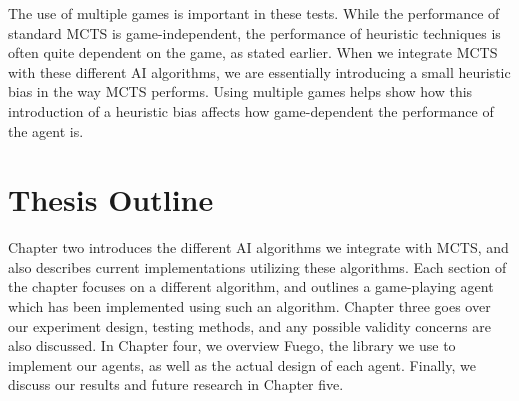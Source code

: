The use of multiple games is important in these tests.  While the performance of standard MCTS is game-independent, the performance of heuristic techniques is often quite dependent on the game, as stated earlier.  When we integrate MCTS with these different AI algorithms, we are essentially introducing a small heuristic bias in the way MCTS performs.  Using multiple games helps show how this introduction of a heuristic bias affects how game-dependent the performance of the agent is.


\section{Thesis Outline}\label{sec:outline}
Chapter two introduces the different AI algorithms we integrate with MCTS, and also describes current implementations utilizing these algorithms.  Each section of the chapter focuses on a different algorithm, and outlines a game-playing agent which has been implemented using such an algorithm.  Chapter three goes over our experiment design, testing methods, and any possible validity concerns are also discussed.  In Chapter four, we overview Fuego, the library we use to implement our agents, as well as the actual design of each agent.  Finally, we discuss our results and future research in Chapter five.
